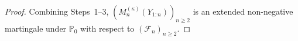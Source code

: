 \documentclass[12pt, a4paper]{report}
\newcommand{\E}{\mathbb{E}}
\newcommand{\dd}{\,\mathrm{d}}
\newcommand{\1}{\mathbf{1}}
\begin{document}
\begin{proof}
\smallskip\noindent Combining Steps~1--3, $(M_n^{(\kappa)}(Y_{1:n}))_{n\geq 2}$
is an extended non-negative martingale under $\mathbb{P}_0$ with respect to
$(\mathcal{F}_n)_{n\geq 2}$.
\end{proof}






\end{document}
